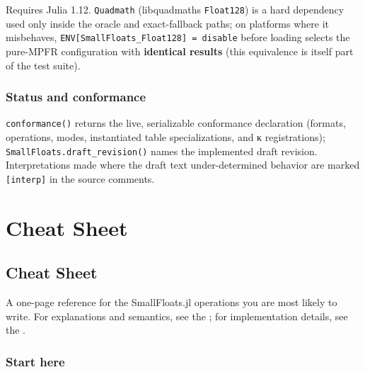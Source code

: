 Requires Julia 1.12. \texttt{Quadmath} (libquadmath{\textquotesingle}s \texttt{Float128}) is a hard dependency used only inside the oracle and exact-fallback paths; on platforms where it misbehaves, \texttt{ENV[{\textquotedbl}SmallFloats\_Float128{\textquotedbl}] = {\textquotedbl}disable{\textquotedbl}} before loading selects the pure-MPFR configuration with \textbf{identical results} (this equivalence is itself part of the test suite).



\section{Status and conformance}



\label{11983925649891201722}{}


\texttt{conformance()} returns the live, serializable conformance declaration (formats, operations, modes, instantiated table specializations, and κ registrations); \texttt{SmallFloats.draft\_revision()} names the implemented draft revision. Interpretations made where the draft text under-determined behavior are marked \texttt{[interp]} in the source comments.



\part{Cheat Sheet}


\chapter{Cheat Sheet}



\label{17671780375889550826}{}


A one-page reference for the SmallFloats.jl operations you are most likely to write. For explanations and semantics, see the ; for implementation details, see the .



\section{Start here}



\label{11995297219376789591}{}



